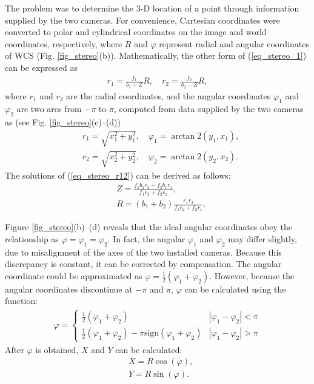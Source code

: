 \documentclass[10pt,letterpaper,journal,final,twoside,twocolumn,nofonttune]{IEEEtran}
\begin{document}
The problem was to determine the 3-D location of a point through information supplied by the two cameras. For convenience, Cartesian coordinates were converted to polar and cylindrical coordinates on the image and world coordinates, respectively, where $R$ and $\varphi$ represent radial and angular coordinates of WCS (Fig. \ref{fig_stereo}(b)). Mathematically, the other form of (\ref{eq_stereo_1}) can be expressed as
\begin{equation}
\label{eq_stereo_r12}
\begin{aligned}
r_1=\frac{f_1}{b_{1}+Z}R,\quad 
r_2=\frac{f_2}{b_{2}-Z}R,
\end{aligned}
\end{equation}
where $r_1$ and $r_2$ are the radial coordinates, and the angular coordinates $\varphi_1$ and $\varphi_2$ are two arcs from $-\pi$ to $\pi$, computed from data supplied by the two cameras as (see Fig. \ref{fig_stereo}(c)--(d))
\begin{align}
&r_1 =\sqrt{x_1^{2} + y_1^{2}}, \quad \varphi_1 =\arctan2\left(y_1,x_1\right),\\
&r_2 =\sqrt{x_2^{2} + y_2^{2}},\quad \varphi_2 =\arctan2\left(y_2,x_2\right).
\end{align}
The solutions of (\ref{eq_stereo_r12}) can be derived as follows:
\begin{align}
\label{eq_stereo_Z}
&Z = \frac{f_1b_2r_2-f_2b_1r_1}{f_1r_2+f_2r_1},\\
\label{eq_stereo_R}
&R = (b_{1}+b_{2})\frac{r_1r_2}{f_1r_2+f_2r_1}.
\end{align}

Figure \ref{fig_stereo}(b)--(d) reveals that the ideal angular coordinates obey the relationship as $\varphi = \varphi_1 = \varphi_2$. In fact, the angular $\varphi_1$ and $\varphi_2$ may differ slightly, due to  misalignment of the axes of the two installed cameras. Because this discrepancy is constant, it can be corrected by compensation. The angular coordinate could be approximated as $\varphi = \frac{1}{2}(\varphi_1 + \varphi_2)$. However, because the angular coordinates discontinue at $-\pi$ and $\pi$, $\varphi$ can be calculated using the function:
\begin{equation}
\label{eq_stereo_phi}
\begin{aligned}
\varphi = 
\begin{cases} 
\frac{1}{2}(\varphi_1 + \varphi_2) & |\varphi_1 - \varphi_2|< \pi \\
\frac{1}{2}(\varphi_1 + \varphi_2)- \pi \mathrm{sign}(\varphi_1 + \varphi_2) & |\varphi_1 - \varphi_2|> \pi 
\end{cases}
\end{aligned}
\end{equation}
After $\varphi$ is obtained, $X$ and $Y$ can be calculated: 
\begin{align}
\label{eq_stereo_X}
&X = R\cos(\varphi),\\  
\label{eq_stereo_Y}
&Y = R\sin(\varphi).
\end{align}
\end{document}
